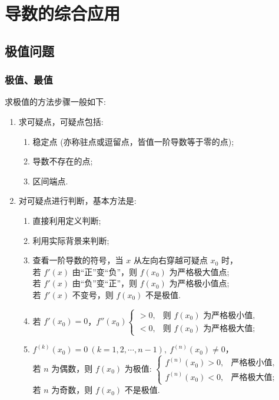 \section{导数的综合应用}

\subsection{极值问题}

\subsubsection{极值、最值}

求极值的方法步骤一般如下:
\begin{enumerate}[label=(\arabic{*})]
    \item 求可疑点，可疑点包括:
          \begin{enumerate}[label=(\roman{*})]
              \item 稳定点 (亦称驻点或逗留点，皆值一阶导数等于零的点);
              \item 导数不存在的点;
              \item 区间端点.
          \end{enumerate}
    \item 对可疑点进行判断，基本方法是:
          \begin{enumerate}[label=(\roman{*})]
              \item 直接利用定义判断;
              \item 利用实际背景来判断;
              \item 查看一阶导数的符号，当 $x$ 从左向右穿越可疑点 $x_0$ 时，\\
                    若 $f'(x)$ 由“正”变“负”，则 $f(x_0)$ 为严格极大值点;\\
                    若 $f'(x)$ 由“负”变“正”，则 $f(x_0)$ 为严格极小值点;\\
                    若 $f'(x)$ 不变号，则 $f(x_0)$ 不是极值.
              \item 若 $f'(x_0)=0$，$f''(x_0)\begin{cases}
                            >0 ,&\text{则 } f(x_0) \text{ 为严格极小值,} \\
                            <0 ,&\text{则 } f(x_0) \text{ 为严格极大值;}
                        \end{cases}$
              \item $f^{(k)}(x_0)=0~ (k=1,2,\cdots,n-1),~f^{(n)}(x_0)\neq 0$，\\
                    若 $n$ 为偶数，则 $f(x_0)$ 为极值: $\begin{cases}
                            f^{(n)}(x_0)>0 ,&\text{严格极小值,} \\
                            f^{(n)}(x_0)<0 ,&\text{严格极大值;}
                        \end{cases}$\\
                    若 $n$ 为奇数，则 $f(x_0)$ 不是极值.
          \end{enumerate}
\end{enumerate}

